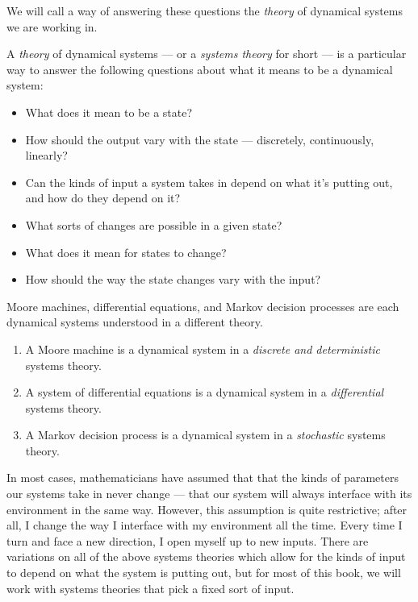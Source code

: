 \documentclass[DynamicalBook]{subfiles}
\begin{document}
We will call a way of answering these questions the \emph{theory} of dynamical
systems we are working in.
\begin{informal}\label{informal.doctrine}
  A \emph{theory} of dynamical systems --- or a \emph{systems theory} for short --- is a particular way to answer the following
  questions about what it means to be a dynamical system:
  \begin{itemize}
  \item What does it mean to be a state?
  \item How should the output vary with the state --- discretely,
    continuously, linearly?
  \item Can the kinds of input a
    system takes in depend on what it's putting out, and how do they depend on it?
  \item What sorts of changes are possible in a given state?
  \item What does it mean for states to change? 
  \item How should the way the state changes vary with the input?
  \end{itemize}
\end{informal}

Moore machines, differential equations, and Markov decision processes are each
dynamical systems understood in a different theory.
\begin{enumerate}
  \item A Moore machine is a dynamical system in a \emph{discrete and
      deterministic} systems theory.
  \item A system of differential equations is a dynamical system in a
    \emph{differential} systems theory.
  \item A Markov decision process is a dynamical system in a \emph{stochastic} systems theory.
\end{enumerate}

In most cases, mathematicians have assumed that that the kinds of parameters our systems take in
never change --- that our system will always interface with
    its environment in the same way. However, this assumption is quite
    restrictive; after all, I change the way I interface with my environment all
    the time. Every time I turn and face a new direction, I open myself up to
    new inputs. There are variations on all of the above systems theories which allow for the
    kinds of input to depend on what the system is putting out, but for most of this book, we will work with systems theories that pick a fixed sort of input.
\end{document}
